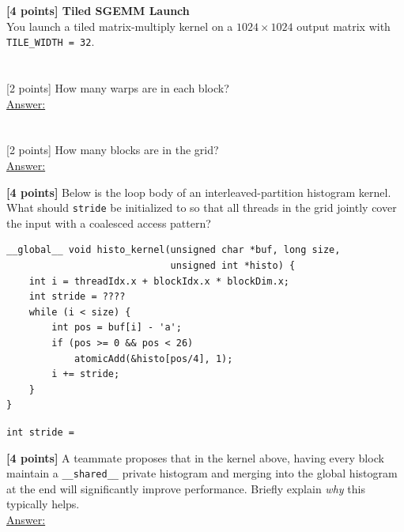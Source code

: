 \documentclass[12pt]{exam}
\newcommand{\Ans}{\underline{Answer:}\ }
\newcommand{\smallbox}{\framebox[5cm]{\rule{0pt}{1.1cm}}}
\newcommand{\widebox}[1][9.5cm]{\framebox[#1]{\rule{0pt}{1.1cm}}}
\newcommand{\paragraphbox}[1]{\framebox[\linewidth]{\rule{0pt}{#1}}}
\begin{document}
\newpage

\begin{questions}

\question \textbf{[4 points] Tiled SGEMM Launch}\\
You launch a tiled matrix-multiply kernel on a $1024 \times 1024$ output matrix with
\texttt{TILE\_WIDTH = 32}.
\begin{parts}
  \part {}[2 points] How many warps are in each block?\\[8pt]
        \Ans \smallbox
  \part {}[2 points] How many blocks are in the grid?\\[8pt]
        \Ans \smallbox
\end{parts}

\vspace{6pt}
\question \textbf{[4 points]} Below is the loop body of an interleaved-partition histogram
kernel. What should \texttt{stride} be initialized to so that all threads in the grid jointly
cover the input with a coalesced access pattern?

\begin{Verbatim}[xleftmargin=2em]
__global__ void histo_kernel(unsigned char *buf, long size,
                             unsigned int *histo) {
    int i = threadIdx.x + blockIdx.x * blockDim.x;
    int stride = ????
    while (i < size) {
        int pos = buf[i] - 'a';
        if (pos >= 0 && pos < 26)
            atomicAdd(&histo[pos/4], 1);
        i += stride;
    }
}
\end{Verbatim}

\vspace{4pt}
\texttt{int stride = }\,\widebox

\vspace{8pt}
\question \textbf{[4 points]} A teammate proposes that in the kernel above, having every block
maintain a \texttt{\_\_shared\_\_} private histogram and merging into the global histogram at
the end will significantly improve performance. Briefly explain \emph{why} this typically
helps.\\[10pt]
\Ans \paragraphbox{2.6cm}


\end{questions}
\end{document}
